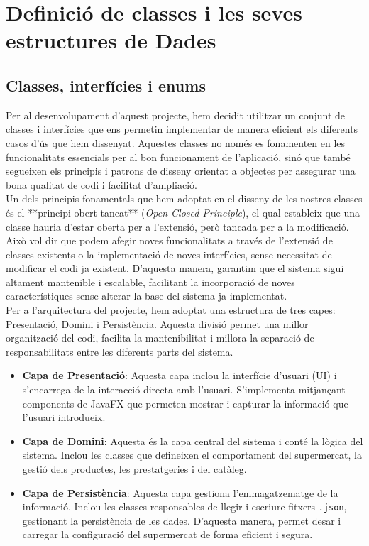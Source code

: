 \documentclass[a4paper,12pt]{report}
\begin{document}
\newpage

\chapter{Definició de classes i les seves estructures de Dades}

\section{Classes, interfícies i enums}

Per al desenvolupament d'aquest projecte, hem decidit utilitzar un conjunt de classes i interfícies que ens permetin implementar de manera eficient els diferents casos d'ús que hem dissenyat. Aquestes classes no només es fonamenten en les funcionalitats essencials per al bon funcionament de l'aplicació, sinó que també segueixen els principis i patrons de disseny orientat a objectes per assegurar una bona qualitat de codi i facilitat d'ampliació. \\

Un dels principis fonamentals que hem adoptat en el disseny de les nostres classes és el **principi obert-tancat** (\textit{Open-Closed Principle}), el qual estableix que una classe hauria d'estar oberta per a l'extensió, però tancada per a la modificació. Això vol dir que podem afegir noves funcionalitats a través de l'extensió de classes existents o la implementació de noves interfícies, sense necessitat de modificar el codi ja existent. D'aquesta manera, garantim que el sistema sigui altament mantenible i escalable, facilitant la incorporació de noves característiques sense alterar la base del sistema ja implementat.\\

Per a l’arquitectura del projecte, hem adoptat una estructura de tres capes: Presentació, Domini i Persistència. Aquesta divisió permet una millor organització del codi, facilita la mantenibilitat i millora la separació de responsabilitats entre les diferents parts del sistema.

\begin{itemize}
	\item \textbf{Capa de Presentació}: Aquesta capa inclou la interfície d’usuari (UI) i s’encarrega de la interacció directa amb l’usuari. S’implementa mitjançant components de JavaFX que permeten mostrar i capturar la informació que l’usuari introdueix.
	
	\item \textbf{Capa de Domini}: Aquesta és la capa central del sistema i conté la lògica del sistema. Inclou les classes que defineixen el comportament del supermercat, la gestió dels productes, les prestatgeries i del catàleg.
	
	\item \textbf{Capa de Persistència}: Aquesta capa gestiona l’emmagatzematge de la informació. Inclou les classes responsables de llegir i escriure fitxers \texttt{.json}, gestionant la persistència de les dades. D’aquesta manera, permet desar i carregar la configuració del supermercat de forma eficient i segura.
\end{itemize}
\end{document}
